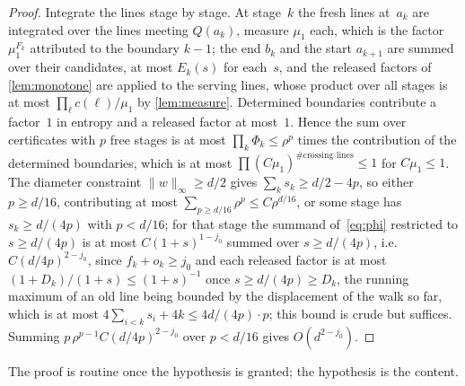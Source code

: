 \documentclass[11pt,letterpaper]{article}
\begin{document}
\begin{proof}
Integrate the lines stage by stage. At stage~$k$ the fresh lines at~$a_k$ are integrated over the lines meeting $Q(a_k)$, measure $\mu_1$ each, which is the factor $\mu_1^{F_k}$ attributed to the boundary $k-1$; the end $b_k$ and the start $a_{k+1}$ are summed over their candidates, at most $E_k(s)$ for each~$s$, and the released factors of \cref{lem:monotone} are applied to the serving lines, whose product over all stages is at most $\prod_\ell c(\ell)/\mu_1$ by \cref{lem:measure}. Determined boundaries contribute a factor~$1$ in entropy and a released factor at most~$1$. Hence the sum over certificates with $p$ free stages is at most $\prod_k\Phi_k\le\rho^{p}$ times the contribution of the determined boundaries, which is at most $\prod(C\mu_1)^{\#\text{crossing lines}}\le1$ for $C\mu_1\le1$. The diameter constraint $\lVert w\rVert_\infty\ge d/2$ gives $\sum_ks_k\ge d/2-4p$, so either $p\ge d/16$, contributing at most $\sum_{p\ge d/16}\rho^p\le C\rho^{d/16}$, or some stage has $s_k\ge d/(4p)$ with $p<d/16$; for that stage the summand of~\eqref{eq:phi} restricted to $s\ge d/(4p)$ is at most $C(1+s)^{1-j_0}$ summed over $s\ge d/(4p)$, i.e.\ $C(d/4p)^{2-j_0}$, since $f_k+o_k\ge j_0$ and each released factor is at most $(1+D_k)/(1+s)\le(1+s)^{-1}$ once $s\ge d/(4p)\ge D_k$, the running maximum of an old line being bounded by the displacement of the walk so far, which is at most $4\sum_{i<k}s_i+4k\le4d/(4p)\cdot p$; this bound is crude but suffices. Summing $p\,\rho^{p-1}C(d/4p)^{2-j_0}$ over $p<d/16$ gives $O(d^{2-j_0})$.
\end{proof}

The proof is routine once the hypothesis is granted; the hypothesis is the content.
\end{document}
